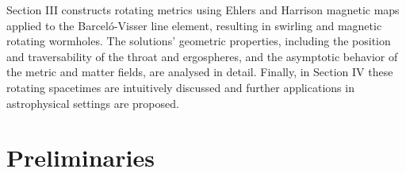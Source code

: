 \documentclass[aps,preprint,groupedaddress,nofootinbib,superscriptaddress,showkeys,showpacs,eqsecnum,amsmath,amssymb]{revtex4-1}
\begin{document}
Section III constructs rotating metrics using Ehlers and Harrison magnetic maps applied to the Barcel\'o-Visser line element, resulting in swirling and magnetic rotating wormholes. 
The solutions' geometric properties, including the position and traversability of the throat and ergospheres, and the asymptotic behavior of the metric and matter fields, are analysed in detail. Finally, in Section IV these rotating spacetimes are intuitively discussed and further applications in astrophysical settings are proposed. 


\section{Preliminaries}
\end{document}
